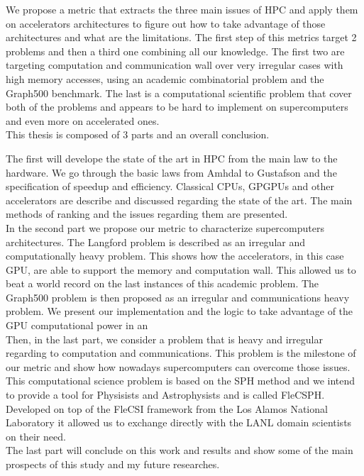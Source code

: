 We propose a metric that extracts the three main issues of HPC and apply them on accelerators architectures to figure out how to take advantage of those architectures and what are the limitations. 
The first step of this metrics target 2 problems and then a third one combining all our knowledge.
The first two are targeting computation and communication wall over very irregular cases with high memory accesses, using an academic combinatorial problem and the Graph500 benchmark. 
The last is a computational scientific problem that cover both of the problems and appears to be hard to implement on supercomputers and even more on accelerated ones.\\

This thesis is composed of 3 parts and an overall conclusion. 

The first will develope the state of the art in HPC from the main law to the hardware. 	
We go through the basic laws from Amhdal to Gustafson and the specification of speedup and efficiency.
Classical CPUs, GPGPUs and other accelerators are describe and discussed regarding the state of the art. 
The main methods of ranking and the issues regarding them are presented.\\ 

In the second part we propose our metric to characterize supercomputers architectures. 
The Langford problem is described as an irregular and computationally heavy problem.
This shows how the accelerators, in this case GPU, are able to support the memory and computation wall. 
This allowed us to beat a world record on the last instances of this academic problem.
The Graph500 problem is then proposed as an irregular and communications heavy problem. 
We present our implementation and the logic to take advantage of the GPU computational power in an \\

Then, in the last part, we consider a problem that is heavy and irregular regarding to computation and communications.
This problem is the milestone of our metric and show how nowadays supercomputers can overcome those issues. 
This computational science problem is based on the SPH method and we intend to provide a tool for Physisists and Astrophysists and is called FleCSPH. 
Developed on top of the FleCSI framework from the Los Alamos National Laboratory it allowed us to exchange directly with the LANL domain scientists on their need.\\

The last part will conclude on this work and results and show some of the main prospects of this study and my future researches. 